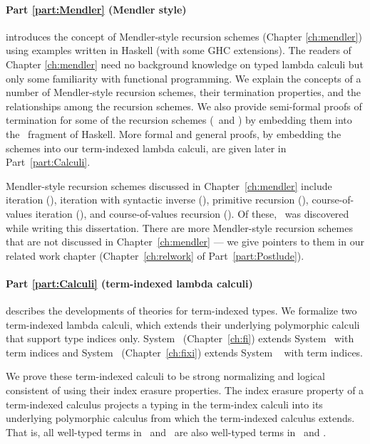 \paragraph{Part \ref{part:Mendler} (Mendler style)}\hspace*{-.7em}
introduces
the concept of Mendler-style recursion schemes (Chapter \ref{ch:mendler})
using examples written in Haskell (with some GHC extensions). The readers
of Chapter \ref{ch:mendler} need no background knowledge
on typed lambda calculi but only some familiarity with functional programming.
We explain the concepts of a number of Mendler-style recursion schemes,
their termination properties, and the relationships among the recursion schemes.
We also provide semi-formal proofs of termination for some of
the recursion schemes (\MIt\ and \MsfIt) by embedding them into
the \Fw\ fragment of Haskell. More formal and general proofs,
by embedding the schemes into our term-indexed lambda calculi,
are given later in Part~\ref{part:Calculi}.

Mendler-style recursion schemes discussed in Chapter~\ref{ch:mendler}
include iteration (\MIt), iteration with syntactic inverse (\MsfIt),
primitive recursion (\MPr), course-of-values iteration (\McvIt),
and course-of-values recursion (\McvPr). Of these, \MsfIt\ was discovered
while writing this dissertation.
There are more Mendler-style recursion schemes that are not discussed
in Chapter~\ref{ch:mendler} --- we give pointers to them in our
related work chapter (Chapter~\ref{ch:relwork} of Part~\ref{part:Postlude}).

\paragraph{Part \ref{part:Calculi} (term-indexed lambda calculi)}\hspace{-1em}
describes the developments of theories for term-indexed types.
We formalize two term-indexed lambda calculi, which extends
their underlying polymorphic calculi that support type indices only.
System \Fi\ (Chapter~\ref{ch:fi}) extends System \Fw\ with term indices and
System \Fixi\ (Chapter~\ref{ch:fixi}) extends System \Fixw\ \cite{AbeMat04}
with term indices.

We prove these term-indexed calculi to be strong normalizing and
logical consistent of using their index erasure properties.
The index erasure property of a term-indexed calculus
projects a typing in the term-index calculi into its underlying
polymorphic calculus from which the term-indexed calculus extends.
That is, all well-typed terms in \Fi\ and \Fixi\ are
also well-typed terms in \Fw\ and \Fixw.

